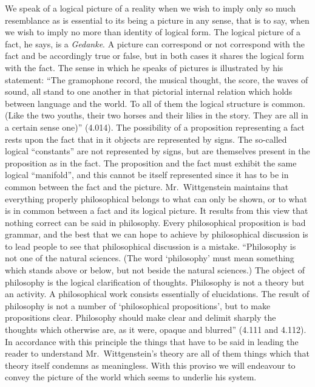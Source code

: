 We speak of a logical picture of a reality when we wish to imply only so much resemblance as is essential to its being a picture in any sense, that is to say, when we wish to imply no more than identity of logical form. The logical picture of a fact, he says, is a \emph{Gedanke}. A picture can correspond or not correspond with the fact and be accordingly true or false, but in both cases it shares the logical form with the fact. The sense in which he speaks of pictures is illustrated by his statement: “The gramophone record, the musical thought, the score, the waves of sound, all stand to one another in that pictorial internal relation which holds between language and the world. To all of them the logical structure is common. (Like the two youths, their two horses and their lilies in the story. They are all in a certain sense one)” (4.014). The possibility of a proposition representing a fact rests upon the fact that in it objects are represented by signs. The so-called logical “constants” are not represented by signs, but are themselves present in the proposition as in the fact. The proposition and the fact must exhibit the same logical “manifold”, and this cannot be itself represented since it has to be in common between the fact and the picture. Mr.\ Wittgenstein maintains that everything properly philosophical belongs to what can only be shown, or to what is in common between a fact and its logical picture. It results from this view that nothing correct can be said in philosophy. Every philosophical proposition is bad grammar, and the best that we can hope to achieve by philosophical discussion is to lead people to see that philosophical discussion is a mistake. “Philosophy is not one of the natural sciences. (The word ‘philosophy’ must mean something which stands above or below, but not beside the natural sciences.) The object of philosophy is the logical clarification of thoughts. Philosophy is not a theory but an activity. A philosophical work consists essentially of elucidations. The result of philosophy is not a number of ‘philosophical propositions’, but to make propositions clear. Philosophy should make clear and delimit sharply the thoughts which otherwise are, as it were, opaque and blurred” (4.111 and 4.112). In accordance with this principle the things that have to be said in leading the reader to understand Mr.\ Wittgenstein’s theory are all of them things which that theory itself condemns as meaningless. With this proviso we will endeavour to convey the picture of the world which seems to underlie his system.

